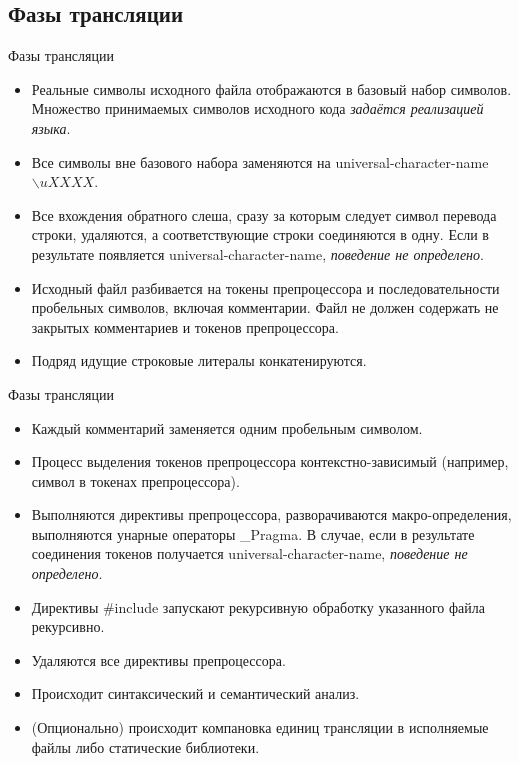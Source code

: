     \subsection{Фазы трансляции}
    \begin{frame}{Фазы трансляции}
        \begin{itemize}
            \item Реальные символы исходного файла отображаются в базовый набор символов.
                Множество принимаемых символов исходного кода \textit{задаётся реализацией языка}.
            \item Все символы вне базового набора заменяются на universal-character-name $\backslash{uXXXX}$.
            \item Все вхождения обратного слеша, сразу за которым следует символ перевода строки,
                удаляются, а соответствующие строки соединяются в одну. Если в результате появляется
                universal-character-name, \textit{поведение не определено}.
            \item Исходный файл разбивается на токены препроцессора и последовательности
                пробельных символов, включая комментарии. Файл не должен содержать не закрытых комментариев и
                токенов препроцессора.
            \item Подряд идущие строковые литералы конкатенируются.
        \end{itemize}
    \end{frame}
    \begin{frame}{Фазы трансляции}
        \begin{itemize}
            \item Каждый комментарий заменяется одним пробельным символом.
            \item Процесс выделения токенов препроцессора контекстно-зависимый (например, символ в токенах препроцессора).
            \item Выполняются директивы препроцессора, разворачиваются макро-определения, выполняются унарные операторы \_Pragma.
                В случае, если в результате соединения токенов получается universal-character-name, \textit{поведение не определено}.
            \item Директивы \#include запускают рекурсивную обработку указанного файла рекурсивно.
            \item Удаляются все директивы препроцессора.
            \item Происходит синтаксический и семантический анализ.
            \item (Опционально) происходит компановка единиц трансляции в исполняемые файлы либо статические библиотеки.
        \end{itemize}
    \end{frame}
